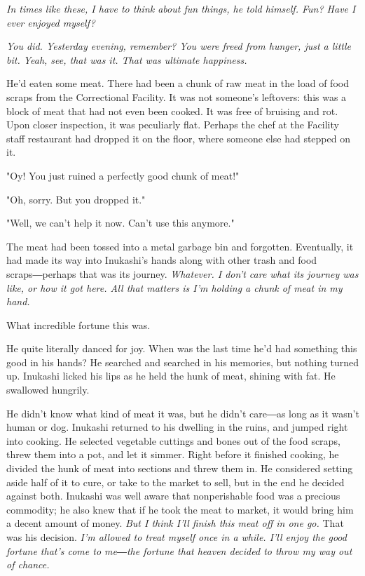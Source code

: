 \emph{In times like these, I have to think about fun things, he told himself.
Fun? Have I ever enjoyed myself?}

\emph{You did. Yesterday evening, remember? You were freed from hunger, just a
little bit. Yeah, see, that was it. That was ultimate happiness.}

\myspace

He'd eaten some meat. There had been a chunk of raw meat in the load of
food scraps from the Correctional Facility. It was not someone's
leftovers: this was a block of meat that had not even been cooked. It
was free of bruising and rot. Upon closer inspection, it was peculiarly
flat. Perhaps the chef at the Facility staff restaurant had dropped it
on the floor, where someone else had stepped on it.

"Oy! You just ruined a perfectly good chunk of meat!"

"Oh, sorry. But you dropped it."

"Well, we can't help it now. Can't use this anymore."

The meat had been tossed into a metal garbage bin and forgotten.
Eventually, it had made its way into Inukashi's hands along with other
trash and food scraps―perhaps that was its journey. \emph{Whatever. I don't
care what its journey was like, or how it got here. All that matters is
I'm holding a chunk of meat in my hand.}

What incredible fortune this was.

He quite literally danced for joy. When was the last time he'd had
something this good in his hands? He searched and searched in his
memories, but nothing turned up. Inukashi licked his lips as he held the
hunk of meat, shining with fat. He swallowed hungrily.

He didn't know what kind of meat it was, but he didn't care―as long as
it wasn't human or dog. Inukashi returned to his dwelling in the ruins,
and jumped right into cooking. He selected vegetable cuttings and bones
out of the food scraps, threw them into a pot, and let it simmer. Right
before it finished cooking, he divided the hunk of meat into sections
and threw them in. He considered setting aside half of it to cure, or
take to the market to sell, but in the end he decided against both.
Inukashi was well aware that nonperishable food was a precious
commodity; he also knew that if he took the meat to market, it would
bring him a decent amount of money. \emph{But I think I'll finish this meat
off in one go.} That was his decision. \emph{I'm allowed to treat myself once
in a while. I'll enjoy the good fortune that's come to me―the fortune
that heaven decided to throw my way out of chance.}

